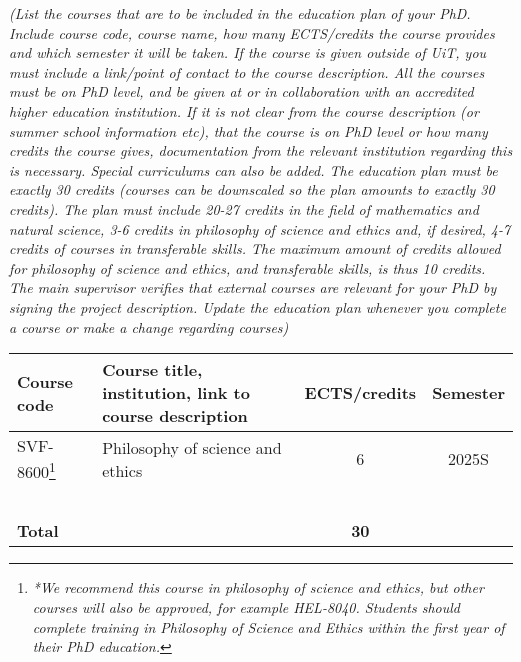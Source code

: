 %
%
\textit{(List the courses that are to be included in the education plan of your PhD. Include course code, course name, how many ECTS/credits the course provides and which semester it will be taken. If the course is given outside of UiT, you must include a link/point of contact to the course description. All the courses must be on PhD level, and be given at or in collaboration with an accredited higher education institution. If it is not clear from the course description (or summer school information etc), that the course is on PhD level or how many credits the course gives, documentation from the relevant institution regarding this is necessary. Special curriculums can also be added. The education plan must be exactly 30 credits (courses can be downscaled so the plan amounts to exactly 30 credits). The plan must include 20-27 credits in the field of mathematics and natural science, 3-6 credits in philosophy of science and ethics and, if desired, 4-7 credits of courses in transferable skills. The maximum amount of credits allowed for philosophy of science and ethics, and transferable skills, is thus 10 credits. The main supervisor verifies that external courses are relevant for your PhD by signing the project description. Update the education plan whenever you complete a course or make a change regarding courses)}


%
%

\begin{tabularx}{\textwidth}{|l|X|c|c|}
    \hline
    \textbf{Course code} & \textbf{Course title, institution, link to course description} & \textbf{ECTS/credits} & \textbf{Semester} \\
    \hline
    SVF-8600\footnote{\textit{*We recommend this course in philosophy of science and ethics, but other courses will also be approved, for example HEL-8040. Students should complete training in Philosophy of Science and Ethics within the first year of their PhD education.}} & Philosophy of science and ethics & 6 & 2025S \\
    \hline 
    & & & \\
    \hline
    & & & \\
    \hline 
    & & & \\
    \hline
    & & & \\
    \hline
    & & & \\
    \hline
    \textbf{Total} & & \textbf{30} & \\
    \hline
\end{tabularx}